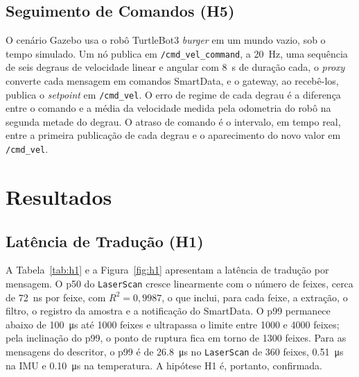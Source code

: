 \documentclass[
    12pt,
    oneside,
    a4paper,
    chapter=TITLE,
    section=TITLE,
    english,
    brazil
]{abntex2}
\begin{document}
\subsection{Seguimento de Comandos (H5)}
O cenário Gazebo \cite{koenig2004gazebo} usa o robô TurtleBot3
\textit{burger} em um mundo vazio, sob o tempo simulado. Um nó publica em
\texttt{/cmd\_vel\_command}, a \SI{20}{\hertz}, uma sequência de seis
degraus de velocidade linear e angular com \SI{8}{\second} de duração
cada, o \textit{proxy} converte cada mensagem em comandos SmartData, e o
gateway, ao recebê-los, publica o \textit{setpoint} em \texttt{/cmd\_vel}.
O erro de regime de cada degrau é a diferença entre o comando e a média da
velocidade medida pela odometria do robô na segunda metade do degrau. O
atraso de comando é o intervalo, em tempo real, entre a primeira
publicação de cada degrau e o aparecimento do novo valor em
\texttt{/cmd\_vel}.

\section{Resultados}
\label{sec:resultados}

\subsection{Latência de Tradução (H1)}
\label{sec:res-h1}
A Tabela~\ref{tab:h1} e a Figura~\ref{fig:h1} apresentam a latência de
tradução por mensagem. O p50 do \texttt{LaserScan} cresce linearmente com
o número de feixes, cerca de \SI{72}{\nano\second} por feixe, com
$R^2 = 0{,}9987$, o que inclui, para cada feixe, a extração, o filtro, o
registro da amostra e a notificação do SmartData. O p99 permanece abaixo
de \SI{100}{\micro\second} até \num{1000} feixes e ultrapassa o limite
entre \num{1000} e \num{4000} feixes; pela inclinação do p99, o ponto de
ruptura fica em torno de \num{1300} feixes. Para as mensagens do
descritor, o p99 é de \SI{26.8}{\micro\second} no \texttt{LaserScan} de
360 feixes, \SI{0.51}{\micro\second} na IMU e \SI{0.10}{\micro\second} na
temperatura. A hipótese H1 é, portanto, confirmada.
\end{document}
